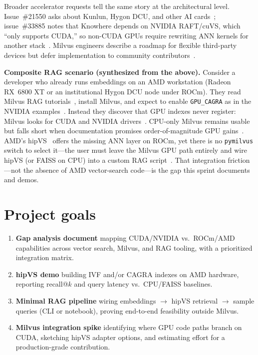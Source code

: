 \documentclass[11pt,a4paper]{article}
\begin{document}
Broader accelerator requests tell the same story at the architectural level.
Issue~\#21550 asks about Kunlun, Hygon DCU, and other AI cards~\cite{milvus-accelerator-issue};
issue~\#33885 notes that Knowhere depends on NVIDIA RAFT/cuVS, which ``only supports
CUDA,'' so non-CUDA GPUs require rewriting ANN kernels for another stack~\cite{milvus-huawei-issue}.
Milvus engineers describe a roadmap for flexible third-party devices but defer
implementation to community contributors~\cite{milvus-accelerator-issue,milvus-huawei-issue}.

\medskip
\noindent\textbf{Composite RAG scenario (synthesized from the above).}
Consider a developer who already runs embeddings on an AMD workstation
(Radeon RX~6800 XT or an institutional Hygon DCU node under ROCm).
They read Milvus RAG tutorials~\cite{langchain-rag,rag-lewis2020}, install Milvus,
and expect to enable \texttt{GPU\_CAGRA} as in the NVIDIA examples~\cite{milvus-gpu-index}.
Instead they discover that GPU indexes never register: Milvus looks for CUDA and
NVIDIA drivers~\cite{milvus-prerequisite-gpu,milvus-discussion-23145}.
CPU-only Milvus remains usable but falls short when documentation promises
order-of-magnitude GPU gains~\cite{milvus-gpu-index}.
AMD's hipVS~\cite{hipvs-docs,hipvs-github} offers the missing ANN layer on ROCm,
yet there is no \texttt{pymilvus} switch to select it---the user must leave the
Milvus GPU path entirely and wire hipVS (or FAISS on CPU) into a custom RAG
script~\cite{faiss-github,hipvs-blog}.
That integration friction---not the absence of AMD vector-search code---is the
gap this sprint documents and demos.

\section{Project goals}
\label{sec:goals}

\begin{enumerate}[label=\textbf{G\arabic*.}, leftmargin=*]
  \item \textbf{Gap analysis document} mapping CUDA/NVIDIA vs.\ ROCm/AMD capabilities
        across vector search, Milvus, and RAG tooling, with a prioritized integration
        matrix.
  \item \textbf{hipVS demo} building IVF and/or CAGRA indexes on AMD hardware,
        reporting recall@$k$ and query latency vs.\ CPU/FAISS baselines.
  \item \textbf{Minimal RAG pipeline} wiring embeddings $\rightarrow$ hipVS retrieval
        $\rightarrow$ sample queries (CLI or notebook), proving end-to-end feasibility
        outside Milvus.
  \item \textbf{Milvus integration spike} identifying where GPU code paths branch on
        CUDA, sketching hipVS adapter options, and estimating effort for a production-grade
        contribution.
\end{enumerate}
\end{document}
